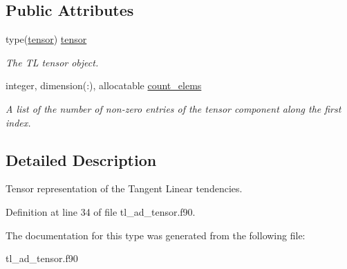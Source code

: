 \subsection*{Public Attributes}
\begin{DoxyCompactItemize}
\item 
\mbox{\label{structtl__ad__tensor_1_1tltensor_a4ce89c8dccec756a7964b381719b95a5}} 
type(\hyperlink{structtensor__def_1_1tensor}{tensor}) \hyperlink{structtl__ad__tensor_1_1tltensor_a4ce89c8dccec756a7964b381719b95a5}{tensor}
\begin{DoxyCompactList}\small\item\em The TL tensor object. \end{DoxyCompactList}\item 
\mbox{\label{structtl__ad__tensor_1_1tltensor_af957e83eded70844c88f2b8d5df30b25}} 
integer, dimension(\+:), allocatable \hyperlink{structtl__ad__tensor_1_1tltensor_af957e83eded70844c88f2b8d5df30b25}{count\+\_\+elems}
\begin{DoxyCompactList}\small\item\em A list of the number of non-\/zero entries of the tensor component along the first index. \end{DoxyCompactList}\end{DoxyCompactItemize}


\subsection{Detailed Description}
Tensor representation of the Tangent Linear tendencies. 

Definition at line 34 of file tl\+\_\+ad\+\_\+tensor.\+f90.



The documentation for this type was generated from the following file\+:\begin{DoxyCompactItemize}
\item 
tl\+\_\+ad\+\_\+tensor.\+f90\end{DoxyCompactItemize}
